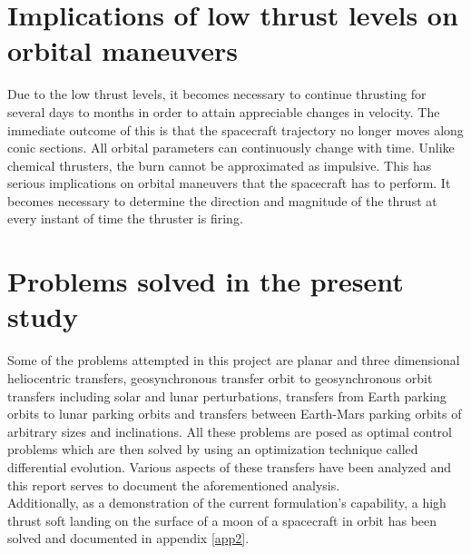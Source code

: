 \section{Implications of low thrust levels on orbital maneuvers}
Due to the low thrust levels, it becomes necessary to continue thrusting for several days to months in order to attain appreciable changes in velocity. The immediate outcome of this is that the spacecraft trajectory no longer moves along conic sections. All orbital parameters can continuously change with time. Unlike chemical thrusters, the burn cannot be approximated as impulsive. This has serious implications on orbital maneuvers that the spacecraft has to perform. It becomes necessary to determine the direction and magnitude of the thrust at every instant of time the thruster is firing. 


\section{Problems solved in the present study}
Some of the problems attempted in this project are planar and three dimensional heliocentric transfers, geosynchronous transfer orbit to geosynchronous orbit transfers including solar and lunar perturbations, transfers from Earth parking orbits to lunar parking orbits and transfers between Earth-Mars parking orbits of arbitrary sizes and inclinations. All these problems are posed as optimal control problems which are then solved by using an optimization technique called differential evolution. Various aspects of these transfers have been analyzed and this report serves to document the aforementioned analysis.\\
Additionally, as a demonstration of the current formulation's capability, a high thrust soft landing on the surface of a moon of a spacecraft in orbit has been solved and documented in appendix \ref{app2}.


